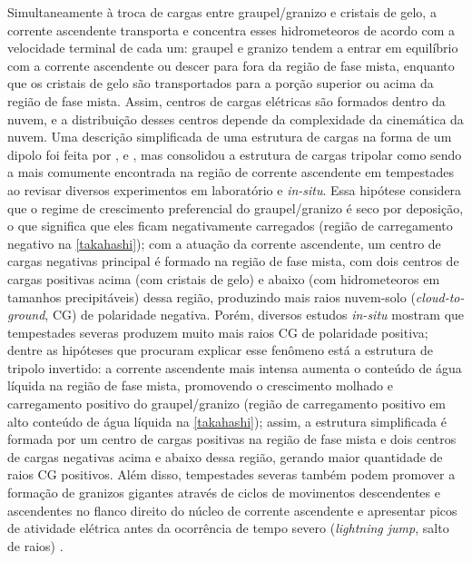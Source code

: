 Simultaneamente à troca de cargas entre graupel/granizo e cristais de gelo, a corrente ascendente transporta e concentra esses hidrometeoros de acordo com a velocidade terminal de cada um: graupel e granizo tendem a entrar em equilíbrio com a corrente ascendente ou descer para fora da região de fase mista, enquanto que os cristais de gelo são transportados para a porção superior ou acima da região de fase mista. Assim, centros de cargas elétricas são formados dentro da nuvem, e a distribuição desses centros depende da complexidade da cinemática da nuvem. Uma descrição simplificada de uma estrutura de cargas na forma de um dipolo foi feita por ,  e , mas  consolidou a estrutura de cargas tripolar como sendo a mais comumente encontrada na região de corrente ascendente em tempestades ao revisar diversos experimentos em laboratório e \textit{in-situ}. Essa hipótese considera que o regime de crescimento preferencial do graupel/granizo é seco por deposição, o que significa que eles ficam negativamente carregados (região de carregamento negativo na \autoref{takahashi}); com a atuação da corrente ascendente, um centro de cargas negativas principal é formado na região de fase mista, com dois centros de cargas positivas acima (com cristais de gelo) e abaixo (com hidrometeoros em tamanhos precipitáveis) dessa região, produzindo mais raios nuvem-solo (\textit{cloud-to-ground}, CG) de polaridade negativa. Porém, diversos estudos \textit{in-situ}  \cite{Macgorman1994, Carey1995a, Lyons1998, Carey2003e, Carey2007, Pineda2016} mostram que tempestades severas produzem muito mais raios CG de polaridade positiva; dentre as hipóteses que procuram explicar esse fenômeno está a estrutura de tripolo invertido: a corrente ascendente mais intensa aumenta o conteúdo de água líquida na região de fase mista, promovendo o crescimento molhado e carregamento positivo do graupel/granizo (região de carregamento positivo em alto conteúdo de água líquida na \autoref{takahashi}); assim, a estrutura simplificada é formada por um centro de cargas positivas na região de fase mista e dois centros de cargas negativas acima e abaixo dessa região, gerando maior quantidade de raios CG positivos. Além disso, tempestades severas também podem promover a formação de granizos gigantes através de ciclos de movimentos descendentes e ascendentes no flanco direito do núcleo de corrente ascendente \cite{Knight1970, Knight2001c, Knight2005} e apresentar picos de atividade elétrica antes da ocorrência de tempo severo (\textit{lightning jump}, salto de raios) \cite{Goodman1988, Williams1999, Schultz2009a, Gatlin2010, Schultz2011}.

